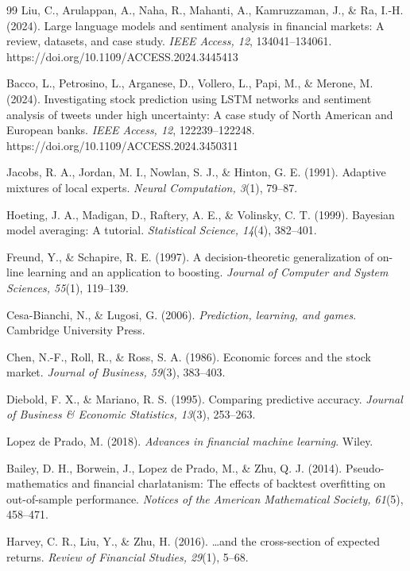 \documentclass[10pt,a4paper,twocolumn]{article}
\begin{document}
\begin{thebibliography}{99}
 Liu, C., Arulappan, A., Naha, R., Mahanti, A., Kamruzzaman, J., \& Ra, I.-H. (2024). Large language models and sentiment analysis in financial markets: A review, datasets, and case study. \textit{IEEE Access, 12}, 134041--134061. https://doi.org/10.1109/ACCESS.2024.3445413

 Bacco, L., Petrosino, L., Arganese, D., Vollero, L., Papi, M., \& Merone, M. (2024). Investigating stock prediction using LSTM networks and sentiment analysis of tweets under high uncertainty: A case study of North American and European banks. \textit{IEEE Access, 12}, 122239--122248. https://doi.org/10.1109/ACCESS.2024.3450311

 Jacobs, R. A., Jordan, M. I., Nowlan, S. J., \& Hinton, G. E. (1991). Adaptive mixtures of local experts. \textit{Neural Computation, 3}(1), 79--87.

 Hoeting, J. A., Madigan, D., Raftery, A. E., \& Volinsky, C. T. (1999). Bayesian model averaging: A tutorial. \textit{Statistical Science, 14}(4), 382--401.

 Freund, Y., \& Schapire, R. E. (1997). A decision-theoretic generalization of on-line learning and an application to boosting. \textit{Journal of Computer and System Sciences, 55}(1), 119--139.

 Cesa-Bianchi, N., \& Lugosi, G. (2006). \textit{Prediction, learning, and games}. Cambridge University Press.

 Chen, N.-F., Roll, R., \& Ross, S. A. (1986). Economic forces and the stock market. \textit{Journal of Business, 59}(3), 383--403.

 Diebold, F. X., \& Mariano, R. S. (1995). Comparing predictive accuracy. \textit{Journal of Business \& Economic Statistics, 13}(3), 253--263.

 Lopez de Prado, M. (2018). \textit{Advances in financial machine learning}. Wiley.

 Bailey, D. H., Borwein, J., Lopez de Prado, M., \& Zhu, Q. J. (2014). Pseudo-mathematics and financial charlatanism: The effects of backtest overfitting on out-of-sample performance. \textit{Notices of the American Mathematical Society, 61}(5), 458--471.

 Harvey, C. R., Liu, Y., \& Zhu, H. (2016). \ldots and the cross-section of expected returns. \textit{Review of Financial Studies, 29}(1), 5--68.


\end{thebibliography}
\end{document}
